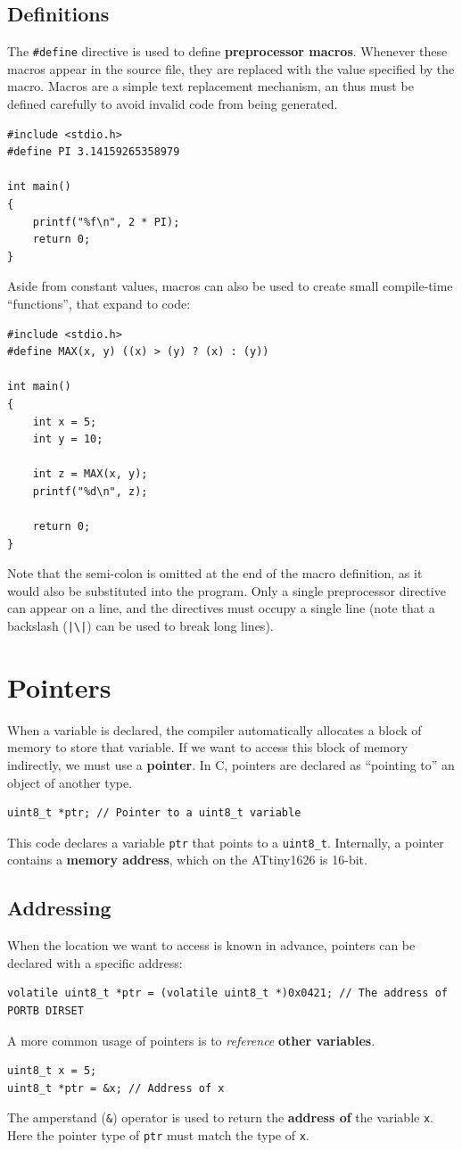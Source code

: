 \documentclass[a4paper]{report}
\begin{document}
\section{Definitions}
The \texttt{#define} directive is used to define \textbf{preprocessor macros}.
Whenever these macros appear in the source file, they are replaced with the value specified by the macro.
Macros are a simple text replacement mechanism, an thus must be defined carefully to avoid
invalid code from being generated.
\begin{verbatim}
#include <stdio.h>
#define PI 3.14159265358979

int main()
{
    printf("%f\n", 2 * PI);
    return 0;
}
\end{verbatim}
Aside from constant values, macros can also be used to create small compile-time ``functions'',
that expand to code:
\begin{verbatim}
#include <stdio.h>
#define MAX(x, y) ((x) > (y) ? (x) : (y))

int main()
{
    int x = 5;
    int y = 10;

    int z = MAX(x, y);
    printf("%d\n", z);

    return 0;
}
\end{verbatim}
Note that the semi-colon is omitted at the end of the macro definition,
as it would also be substituted into the program.
Only a single preprocessor directive can appear on a line, and the directives
must occupy a single line (note that a backslash (\texttt{|\backslash|}) can be used to break long lines). %
\chapter{Pointers}
When a variable is declared, the compiler automatically allocates a block of memory to store that variable.
If we want to access this block of memory indirectly, we must use a \textbf{pointer}.
In C, pointers are declared as ``pointing to'' an object of another type.
\begin{verbatim}
uint8_t *ptr; // Pointer to a uint8_t variable
\end{verbatim}
This code declares a variable \texttt{ptr} that points to a \texttt{uint8_t}.
Internally, a pointer contains a \textbf{memory address}, which on the ATtiny1626 is 16-bit.
\section{Addressing}
When the location we want to access is known in advance, pointers can be declared with a
specific address:
\begin{verbatim}
volatile uint8_t *ptr = (volatile uint8_t *)0x0421; // The address of PORTB DIRSET
\end{verbatim}
A more common usage of pointers is to \textit{reference} \textbf{other variables}.
\begin{verbatim}
uint8_t x = 5;
uint8_t *ptr = &x; // Address of x
\end{verbatim}
The amperstand (\texttt{&}) operator is used to return the \textbf{address of} the variable \texttt{x}.
Here the pointer type of \texttt{ptr} must match the type of \texttt{x}.
\end{document}
